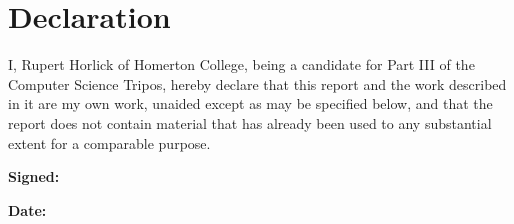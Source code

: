 \documentclass[12pt, parskip, DIV=14]{scrartcl}
\begin{document}
\section*{Declaration}
\thispagestyle{empty}

I, Rupert Horlick of Homerton College, being a candidate for Part III of the Computer Science Tripos, hereby declare that this report and the work described in it are my own work, unaided except as may be specified below, and that the report does not contain material that has already been used to any substantial extent for a comparable purpose.

\textbf{Signed:}

\textbf{Date:}
\end{document}
